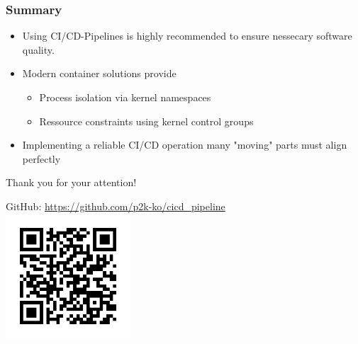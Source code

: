 \begin{frame}
\frametitle{Summary}
\begin{itemize}
\item Using CI/CD-Pipelines is highly recommended to ensure nessecary software quality.
\pause
\item Modern container solutions provide
\begin{itemize}
	\pause
	\item Process isolation via kernel namespaces
	\pause
	\item Ressource constraints using kernel control groups
\end{itemize}
\pause
\item Implementing a reliable CI/CD operation many "moving" parts must align perfectly 
\pause
\end{itemize}
\end{frame}

\begin{frame}
	\begin{center}
		\begin{Huge}
			Thank you for your attention!
		\end{Huge}
		
		\vspace{1cm}
		
		GitHub: \url{https://github.com/p2k-ko/cicd_pipeline}\\
		\includegraphics[width=0.35\textwidth]{img/github.png}
	\end{center}
\end{frame}